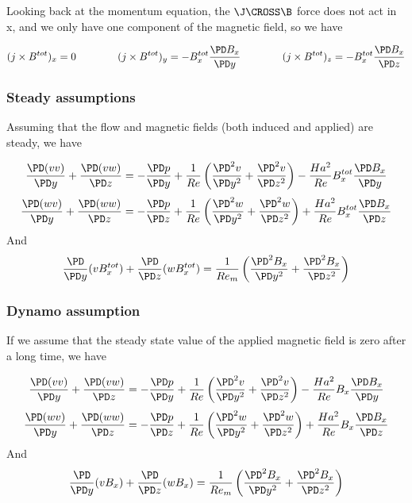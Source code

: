 \documentclass[11pt]{article}
\begin{document}
Looking back at the momentum equation, the $\J \CROSS \B$ force does not act in x, and we only have one component of the magnetic field, so we have

\begin{equation}
	(j \times B^{tot})_x = 0
	\qquad \qquad
	(j \times B^{tot})_y = -	B_x^{tot} \frac{\PD B_x}{\PD y}
	\qquad \qquad
	(j \times B^{tot})_z = - B_x^{tot} \frac{\PD B_x}{\PD z}
\end{equation}

\subsubsection{Steady assumptions}
Assuming that the flow and magnetic fields (both induced and applied) are steady, we have

\begin{equation}
	\frac{\PD (v v)}{\PD y}
	+ \frac{\PD (v w)}{\PD z}
	=
	- \frac{\PD p}{\PD y}
	+ \frac{1}{Re}
	\left(
	\frac{\PD^2 v}{\PD y^2}
	+\frac{\PD^2 v}{\PD z^2}
	\right)
	-
	\frac{Ha^2}{Re}
	B_x^{tot}
	\frac{\PD B_x}{\PD y}
\end{equation}
\begin{equation}
	\frac{\PD (w v)}{\PD y}
	+ \frac{\PD (w w)}{\PD z}
	=
	- \frac{\PD p}{\PD z}
	+ \frac{1}{Re}
	\left(
	\frac{\PD^2 w}{\PD y^2}
	+\frac{\PD^2 w}{\PD z^2}
	\right)
	+ \frac{Ha^2}{Re}
	B_x^{tot}
	\frac{\PD B_x}{\PD z}
\end{equation}
And
\begin{equation}
	\frac{\PD}{\PD y} (v B_x^{tot})
	+ \frac{\PD}{\PD z} (w B_x^{tot})
	=
	\frac{1}{Re_m}
	\left(
	\frac{\PD^2 B_x}{\PD y^2}
	+
	\frac{\PD^2 B_x}{\PD z^2}
	\right)
\end{equation}

\subsubsection{Dynamo assumption}
If we assume that the steady state value of the applied magnetic field is zero after a long time, we have

\begin{equation}
	\frac{\PD (v v)}{\PD y}
	+ \frac{\PD (v w)}{\PD z}
	=
	- \frac{\PD p}{\PD y}
	+ \frac{1}{Re}
	\left(
	\frac{\PD^2 v}{\PD y^2}
	+\frac{\PD^2 v}{\PD z^2}
	\right)
	-
	\frac{Ha^2}{Re}
	B_x
	\frac{\PD B_x}{\PD y}
\end{equation}
\begin{equation}
	\frac{\PD (w v)}{\PD y}
	+ \frac{\PD (w w)}{\PD z}
	=
	- \frac{\PD p}{\PD z}
	+ \frac{1}{Re}
	\left(
	\frac{\PD^2 w}{\PD y^2}
	+\frac{\PD^2 w}{\PD z^2}
	\right)
	+ \frac{Ha^2}{Re}
	B_x
	\frac{\PD B_x}{\PD z}
\end{equation}
And
\begin{equation}
	\frac{\PD}{\PD y} (v B_x)
	+ \frac{\PD}{\PD z} (w B_x)
	=
	\frac{1}{Re_m}
	\left(
	\frac{\PD^2 B_x}{\PD y^2}
	+
	\frac{\PD^2 B_x}{\PD z^2}
	\right)
\end{equation}
\end{document}
